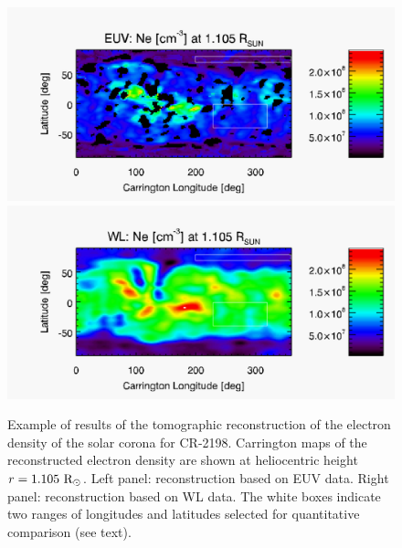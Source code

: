 \documentclass[baaa]{baaa}
\begin{document}
\begin{figure}[t]
  \centering
  \includegraphics[width=\columnwidth]{map_ne_aia.pdf}
  \includegraphics[width=\columnwidth]{map_ne_kcor.pdf}
  \caption{Example of results of the tomographic reconstruction of the electron density of the solar corona for CR-2198. Carrington maps of the reconstructed electron density are shown at heliocentric height $r=1.105~\rm{R}_\odot$. Left panel: reconstruction based on EUV data. Right panel: reconstruction based on WL data. The white boxes indicate two ranges of longitudes and latitudes selected for quantitative comparison (see text).}
  \label{fig_maps}
\end{figure}
\end{document}
